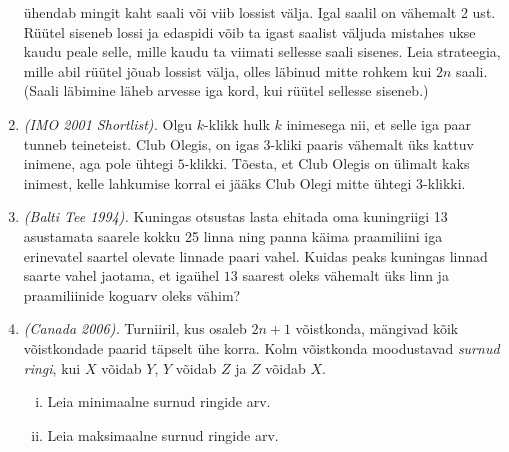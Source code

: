 \documentclass{article}
\begin{document}
\begin{enumerate}
  ühendab mingit kaht saali või viib lossist välja. Igal saalil on
  vähemalt 2 ust. Rüütel siseneb lossi ja edaspidi võib ta igast
  saalist väljuda mistahes ukse kaudu peale selle, mille kaudu ta
  viimati sellesse saali sisenes.  Leia strateegia, mille abil rüütel
  jõuab lossist välja, olles läbinud mitte rohkem kui $2n$
  saali. (Saali läbimine läheb arvesse iga kord, kui rüütel sellesse
  siseneb.)
\item \emph{(IMO 2001 Shortlist).} Olgu $k$-klikk hulk $k$ inimesega
  nii, et selle iga paar tunneb teineteist. Club Olegis, on igas
  $3$-kliki paaris vähemalt üks kattuv inimene, aga pole ühtegi
  $5$-klikki. Tõesta, et Club Olegis on ülimalt kaks inimest, kelle
  lahkumise korral ei jääks Club Olegi mitte ühtegi $3$-klikki.
\item \emph{(Balti Tee 1994).} Kuningas otsustas lasta ehitada oma
  kuningriigi 13 asustamata saarele kokku 25 linna ning panna käima
  praamiliini iga erinevatel saartel olevate linnade paari
  vahel. Kuidas peaks kuningas linnad saarte vahel jaotama, et igaühel
  $13$ saarest oleks vähemalt üks linn ja praamiliinide koguarv oleks
  vähim?
\item \emph{(Canada 2006).} Turniiril, kus osaleb $2n+1$ võistkonda,
  mängivad kõik võistkondade paarid täpselt ühe korra. Kolm võistkonda
  moodustavad \emph{surnud ringi}, kui $X$ võidab $Y$, $Y$ võidab $Z$
  ja $Z$ võidab $X$.
  \begin{enumerate}[(i)]
  \item Leia minimaalne surnud ringide arv.
  \item Leia maksimaalne surnud ringide arv.
  \end{enumerate}
\end{enumerate}
\end{document}
